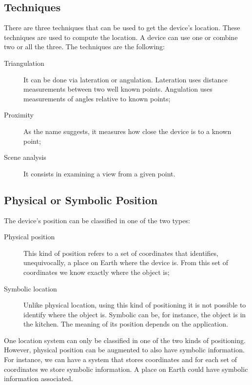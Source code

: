 \subsection{Techniques}
\label{sub:background_techniques}
There are three techniques that can be used to get the device's location.
These techniques are used to compute the location.
A device can use one or combine two or all the three.
The techniques are the following:
\begin{description}
  \item[Triangulation] It can be done via lateration or angulation. Lateration uses distance measurements between two well known points.
  Angulation uses measurements of angles relative to known points;
  \item[Proximity] As the name suggests, it measures how close the device is to a known point;
  \item[Scene analysis] It consists in examining a view from a given point.
\end{description}

\subsection{Physical or Symbolic Position}
\label{sub:background_physical_or_symbolic_position}
The device's position can be classified in one of the two types:
\begin{description}
  \item[Physical position] This kind of position refers to a set of coordinates that identifies, unequivocally, a place on Earth where the device is. From this set of coordinates we know exactly where the object is;
  \item[Symbolic location] Unlike physical location, using this kind of positioning it is not possible to identify where the object is. Symbolic can be, for instance, the object is in the kitchen.
  The meaning of its position depends on the application.
\end{description}

One location system can only be classified in one of the two kinds of positioning.
However, physical position can be augmented to also have symbolic information.
For instance, we can have a system that stores coordinates and for each set of coordinates we store symbolic information.
A place on Earth could have symbolic information associated.


